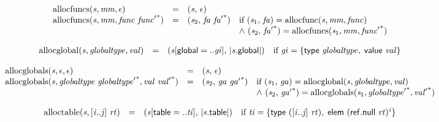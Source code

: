 $$
\begin{array}{@{}lcl@{}l@{}}
{\mathrm{allocfuncs}}({\mathit{s}}, {\mathit{mm}}, \epsilon) &=& ({\mathit{s}},\, \epsilon) &  \\
{\mathrm{allocfuncs}}({\mathit{s}}, {\mathit{mm}}, {\mathit{func}}~{{\mathit{func}'}^\ast}) &=& ({\mathit{s}}_{{2}},\, {\mathit{fa}}~{{\mathit{fa}'}^\ast}) &\quad
  \mbox{if}~({\mathit{s}}_{{1}},\, {\mathit{fa}}) = {\mathrm{allocfunc}}({\mathit{s}}, {\mathit{mm}}, {\mathit{func}}) \\
 &&&\quad {\land}~({\mathit{s}}_{{2}},\, {{\mathit{fa}'}^\ast}) = {\mathrm{allocfuncs}}({\mathit{s}}_{{1}}, {\mathit{mm}}, {{\mathit{func}'}^\ast}) \\
\end{array}
$$

$$
\begin{array}{@{}lcl@{}l@{}}
{\mathrm{allocglobal}}({\mathit{s}}, {\mathit{globaltype}}, {\mathit{val}}) &=& ({\mathit{s}}{}[\mathsf{global} = ..{\mathit{gi}}],\, {|{\mathit{s}}.\mathsf{global}|}) &\quad
  \mbox{if}~{\mathit{gi}} = \{ \begin{array}[t]{@{}l@{}}
\mathsf{type}~{\mathit{globaltype}},\; \mathsf{value}~{\mathit{val}} \}\end{array} \\
\end{array}
$$

$$
\begin{array}{@{}lcl@{}l@{}}
{\mathrm{allocglobals}}({\mathit{s}}, \epsilon, \epsilon) &=& ({\mathit{s}},\, \epsilon) &  \\
{\mathrm{allocglobals}}({\mathit{s}}, {\mathit{globaltype}}~{{\mathit{globaltype}'}^\ast}, {\mathit{val}}~{{\mathit{val}'}^\ast}) &=& ({\mathit{s}}_{{2}},\, {\mathit{ga}}~{{\mathit{ga}'}^\ast}) &\quad
  \mbox{if}~({\mathit{s}}_{{1}},\, {\mathit{ga}}) = {\mathrm{allocglobal}}({\mathit{s}}, {\mathit{globaltype}}, {\mathit{val}}) \\
 &&&\quad {\land}~({\mathit{s}}_{{2}},\, {{\mathit{ga}'}^\ast}) = {\mathrm{allocglobals}}({\mathit{s}}_{{1}}, {{\mathit{globaltype}'}^\ast}, {{\mathit{val}'}^\ast}) \\
\end{array}
$$

$$
\begin{array}{@{}lcl@{}l@{}}
{\mathrm{alloctable}}({\mathit{s}}, {}[{\mathit{i}} .. {\mathit{j}}]~{\mathit{rt}}) &=& ({\mathit{s}}{}[\mathsf{table} = ..{\mathit{ti}}],\, {|{\mathit{s}}.\mathsf{table}|}) &\quad
  \mbox{if}~{\mathit{ti}} = \{ \begin{array}[t]{@{}l@{}}
\mathsf{type}~({}[{\mathit{i}} .. {\mathit{j}}]~{\mathit{rt}}),\; \mathsf{elem}~{(\mathsf{ref.null}~{\mathit{rt}})^{{\mathit{i}}}} \}\end{array} \\
\end{array}
$$

